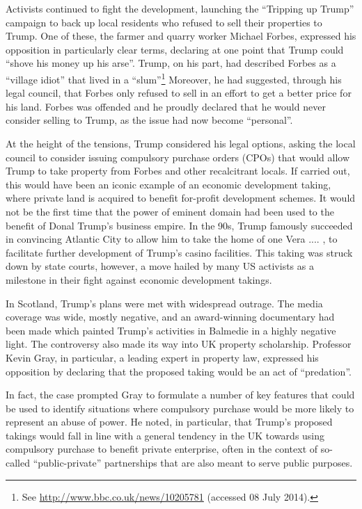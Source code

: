 Activists continued to fight the development, launching the ``Tripping up Trump'' campaign to back up local residents who refused to sell their properties to Trump. One of these, the farmer and quarry worker Michael Forbes, expressed his opposition in particularly clear terms, declaring at one point that Trump could ``shove his money up his arse''. Trump, on his part, had described Forbes as a ``village idiot'' that lived in a ``slum''\footnote{See \url{http://www.bbc.co.uk/news/10205781} (accessed 08 July 2014).} Moreover, he had suggested, through his legal council, that Forbes only refused to sell in an effort to get a better price for his land.  Forbes was offended and he proudly declared that he would never consider selling to Trump, as the issue had now become ``personal''.

At the height of the tensions, Trump considered his legal options, asking the local council to consider issuing compulsory purchase orders (CPOs) that would allow Trump to take property from Forbes and other recalcitrant locals. If carried out, this would have been an iconic example of an economic development taking, where private land is acquired to benefit for-profit development schemes. It would not be the first time that the power of eminent domain had been used to the benefit of Donal Trump's business empire. In the 90s, Trump famously succeeded in convincing Atlantic City to allow him to take the home of one Vera .... , to facilitate further development of Trump's casino facilities. This taking was struck down by state courts, however, a move hailed by many US activists as a milestone in their fight against economic development takings. 

In Scotland, Trump's plans were met with widespread outrage. The media coverage was wide, mostly negative, and an award-winning documentary had been made which painted Trump's activities in Balmedie in a highly negative light. The controversy also made its way into UK property scholarship. Professor Kevin Gray, in particular, a leading expert in property law, expressed his opposition by declaring that the proposed taking would be an act of ``predation''. 

In fact, the case prompted Gray to formulate a number of key features that could be used to identify situations where compulsory purchase would be more likely to represent an abuse of power. He noted, in particular, that Trump's proposed takings would fall in line with a general tendency in the UK towards using compulsory purchase to benefit private enterprise, often in the context of so-called ``public-private'' partnerships that are also meant to serve public purposes.

